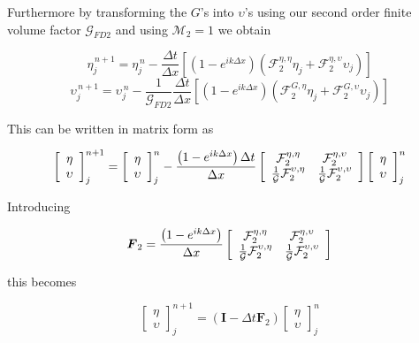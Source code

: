 \documentclass[12pt]{article}
\begin{document}
Furthermore by transforming the $G$'s into $\upsilon$'s using our second order finite volume factor $\mathcal{G}_{FD2}$ and using $\mathcal{M}_2 = 1$ we obtain


\begin{equation*}
\eta^{\,n + 1}_{j} = \eta^{\,n }_{j} - \frac{\Delta t}{\Delta x}  \left[ \left(1 - e^{ik\Delta x}\right) \left(\mathcal{F}_2^{\eta,\eta} \eta_{j}  + \mathcal{F}_2^{\eta,\upsilon} \upsilon_j \right) \right]
\end{equation*}
\begin{equation*}
\upsilon^{\,n + 1}_{j} = \upsilon^{\,n }_{j} -  \frac{1}{\mathcal{G}_{FD2}}\frac{\Delta t}{\Delta x}  \left[ \left(1 - e^{ik\Delta x}\right) \left(  \mathcal{F}_2^{G,\eta} \eta_{j}  + \mathcal{F}_2^{G,\upsilon} \upsilon_j \right) \right]
\end{equation*}

This can be written in matrix form as

\begin{equation*}
\left[\begin{array}{c}
\eta \\ \upsilon
\end{array}\right]^{n+1}_j = \left[\begin{array}{c}
\eta \\ \upsilon
\end{array}\right]^{n}_j - \frac{\left(1 - e^{ik\Delta x}\right) \Delta t}{\Delta x}\left[\begin{array}{c c}
\mathcal{F}_2^{\eta,\eta} & \mathcal{F}_2^{\eta,\upsilon} \\ \frac{1}{\mathcal{G}}\mathcal{F}_2^{\upsilon,\eta} &  \frac{1}{\mathcal{G}}\mathcal{F}_2^{\upsilon,\upsilon} 
\end{array}\right]\left[\begin{array}{c}
\eta \\ \upsilon
\end{array}\right]^{n}_j
\end{equation*}

Introducing 

\[\boldsymbol{F}_2 = \frac{\left(1 - e^{ik\Delta x}\right)}{\Delta x}\left[\begin{array}{c c}
\mathcal{F}_2^{\eta,\eta} & \mathcal{F}_2^{\eta,\upsilon} \\ \frac{1}{\mathcal{G}}\mathcal{F}_2^{\upsilon,\eta} &  \frac{1}{\mathcal{G}}\mathcal{F}_2^{\upsilon,\upsilon} 
\end{array}\right] \]

this becomes

\begin{equation*}
\label{eqn:matrixevolupdate}
\left[\begin{array}{c}
\eta \\ \upsilon
\end{array}\right]^{n+1}_j = \left(\boldsymbol{I}  - \Delta t \boldsymbol{F}_2 \right) \left[\begin{array}{c}
\eta \\ \upsilon
\end{array}\right]^{n}_j
\end{equation*}
\end{document}
